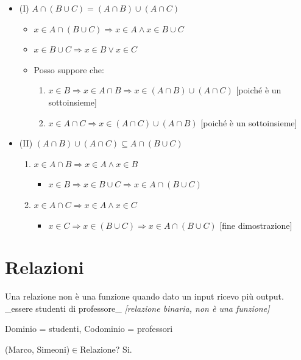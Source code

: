 \documentclass[italian]{article}
\begin{document}
\begin{itemize}
	\item (I) $A\cap (B\cup C)=(A\cap B)\cup (A\cap C)$
	\begin{itemize}
		\item $x \in A \cap (B\cup C) \Rightarrow x\in A \land x\in B\cup C$
		\item $x\in B\cup C \Rightarrow x\in B \lor x\in C$
		\item Posso suppore che:
		\begin{enumerate}[label=(\alph*)]
			\item $x\in B \Rightarrow x\in A\cap B \Rightarrow x\in (A\cap B) \cup (A\cap C)$ [poiché è un sottoinsieme]
			\item $x\in A\cap C \Rightarrow x\in (A\cap C)\cup (A\cap B)$ [poiché è un sottoinsieme]
		\end{enumerate}
	\end{itemize}
	\item (II) $(A\cap B)\cup (A\cap C) \subseteq A \cap (B\cup C)$
	\begin{enumerate}[label=(\alph*)]
		\item $x\in A\cap B \Rightarrow x\in A \land x\in B$
		\begin{itemize}
			\item $x\in B \Rightarrow x\in B\cup C \Rightarrow x\in A\cap (B\cup C)$
		\end{itemize}
		\item $x\in A\cap C \Rightarrow x\in A \land x\in C$
		\begin{itemize}
			\item $x\in C \Rightarrow x\in (B\cup C) \Rightarrow x\in A\cap (B\cup C)$ [fine dimostrazione]
		\end{itemize}
	\end{enumerate}
\end{itemize}
\pagebreak
\section{Relazioni}

Una relazione non è una funzione quando dato un input ricevo più output.\\

\_essere studenti di professore\_ \emph{[relazione binaria, non è una funzione]}

Dominio = studenti, Codominio = professori

(Marco, Simeoni)$\in$Relazione? Si. \\
\end{document}
